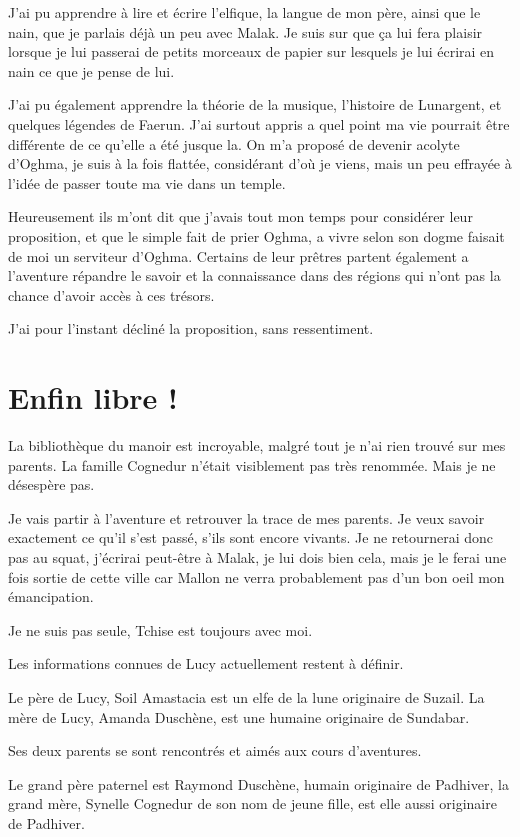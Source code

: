 \documentclass[10pt,a4paper,twoside,twocolumn,openany]{book}
\begin{document}
J'ai pu apprendre à lire et écrire l'elfique, la langue de mon père, ainsi que le nain, que je parlais
déjà un peu avec Malak. Je suis sur que ça lui fera plaisir lorsque je lui passerai de petits morceaux
de papier sur lesquels je lui écrirai en nain ce que je pense de lui.

J'ai pu également apprendre la théorie de la musique, l'histoire de Lunargent, et quelques légendes
de Faerun.
J'ai surtout appris a quel point ma vie pourrait être différente de ce qu'elle a été
jusque la. On m'a proposé de devenir acolyte d'Oghma, je suis à la fois flattée, considérant
d'où je viens, mais un peu effrayée à l'idée de passer toute ma vie dans un temple.

Heureusement ils m'ont dit que j'avais tout mon temps pour considérer leur proposition, et que le
simple fait de prier Oghma, a vivre selon son dogme faisait de moi un serviteur 
d'Oghma. Certains de leur prêtres partent également a l'aventure répandre le savoir et la connaissance
dans des régions qui n'ont pas la chance d'avoir accès à ces trésors.

J'ai pour l'instant décliné la proposition, sans ressentiment.

\section{Enfin libre !}

La bibliothèque du manoir est incroyable, malgré tout je n'ai rien trouvé sur mes parents. 
La famille Cognedur n'était visiblement pas très renommée. Mais je ne désespère pas.

Je vais partir à l'aventure et retrouver la trace de mes parents. Je veux savoir exactement
ce qu'il s'est passé, s'ils sont encore vivants. Je ne retournerai donc pas au squat, j'écrirai
peut-être à Malak, je lui dois bien cela, mais je le ferai une fois sortie de cette ville car
Mallon ne verra probablement pas d'un bon oeil mon émancipation.

Je ne suis pas seule, Tchise est toujours avec moi.

\begin{quotebox}
Les informations connues de Lucy actuellement restent à définir.

Le père de Lucy, Soil Amastacia est un elfe de la lune originaire de Suzail.
La mère de Lucy, Amanda Duschène, est une humaine originaire de Sundabar.

Ses deux parents se sont rencontrés et aimés aux cours d'aventures.

Le grand père paternel est Raymond Duschène, humain originaire de Padhiver, 
la grand mère, Synelle Cognedur de son nom de jeune fille, est elle aussi
originaire de Padhiver.
\end{quotebox}
\end{document}
